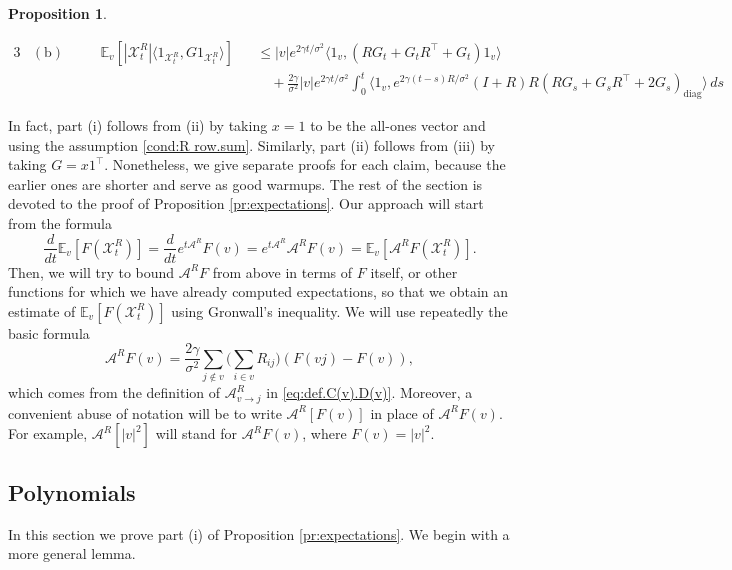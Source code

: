 \documentclass[11pt,reqno]{amsart}
\numberwithin{equation}{section}
\newtheorem{proposition}[theorem]{Proposition}
\theoremstyle{definition}
\def\A{{\mathcal A}}
\def\E{{\mathbb E}}
\def\X{{\mathcal X}}
\begin{document}
\begin{proposition}
\begin{enumerate}[(i)]
\begin{alignat*}{3}
&(\mathrm{b}) \quad  && \E_v[|\X^{R}_t|\langle 1_{\X^{R}_t}, G 1_{\X^{R}_t}\rangle] && \le |v| e^{2\gamma t/\sigma^2 } \big\langle 1_v, (R G_t + G_t R^\top + G_t)1_v\big\rangle   \\
& \  && \  && \quad + \frac{2\gamma}{\sigma^2} |v| e^{2\gamma t/\sigma^2} \int_0^t  \big\langle 1_v,e^{2\gamma (t-s)  R /\sigma^2}(I+R)R(R G_s + G_sR^\top + 2 G_s)_{\mathrm{diag}}\big\rangle   \,ds
\end{alignat*}
\end{enumerate} 
\end{proposition}

In fact, part (i) follows from (ii) by taking $x=1$ to be the all-ones vector and using the assumption \eqref{cond:R row.sum}. Similarly, part (ii) follows from (iii) by taking $G=x1^\top$. 
Nonetheless, we give separate proofs for each claim, because the earlier ones are shorter  and serve as good warmups.
The rest of the section is devoted to the proof of Proposition \ref{pr:expectations}. 
Our approach will start from the formula
\begin{equation}
\frac{d}{dt}\E_v[ F(\X^{R}_t)] = \frac{d}{dt} e^{t \A^{R}} F(v) = e^{t\A^{R}} \A^{R} F(v) = \E_v[\A^{R} F(\X^{R}_t)]. \label{eq:generator}
\end{equation}
Then, we will try to bound $\A^{R} F$ from above in terms of $F$ itself, or other functions for which we have already computed expectations, so that we obtain  an estimate of $\E_v[ F(\X^{R}_t)]$ using Gronwall's inequality. 
We will use repeatedly the basic formula
\begin{equation}
\A^{R} F(v) = \frac{2\gamma}{\sigma^2}\sum_{j \notin v}\Big(\sum_{i \in v} R_{ij}\Big) (F(vj)-F(v)), \label{eq:AF-basic}
\end{equation}
which comes from the definition of $\A^{R}_{v\to j}$ in \eqref{eq:def.C(v).D(v)}.
Moreover, a convenient abuse of notation will be to write $\A^{R}[F(v)]$ in place of $\A^{R} F(v)$. For example, $\A^{R} [|v|^2]$ will stand for $\A^{R} F(v)$, where $F(v)=|v|^2$.

\subsection{Polynomials}

In this section we prove part (i) of Proposition \ref{pr:expectations}. We begin with a more general lemma.
\end{document}
